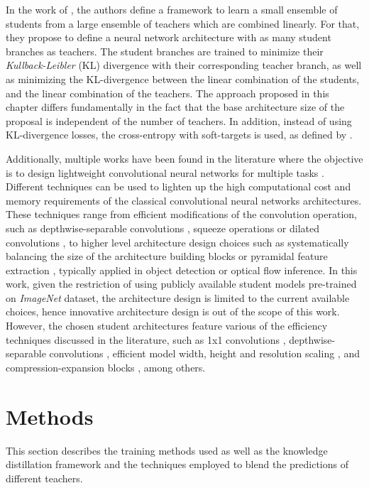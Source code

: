  In the work of \autocite{asif2019}, the authors define a framework to learn a small ensemble of students from a large ensemble of teachers which are combined linearly. For that, they propose to define a neural network architecture with as many student branches as teachers. The student branches are trained to minimize their \textit{Kullback-Leibler} (KL) divergence with their corresponding teacher branch, as well as minimizing the KL-divergence between the linear combination of the students, and the linear combination of the teachers. The approach proposed in this chapter differs fundamentally in the fact that the base architecture size of the proposal is independent of the number of teachers. In addition, instead of using KL-divergence losses, the cross-entropy with soft-targets is used, as defined by \autocite{hinton2015}.

 Additionally, multiple works have been found in the literature where the objective is to design lightweight convolutional neural networks for multiple tasks \autocite{zhou2020, jeon2021, hui2018}. Different techniques can be used to lighten up the high computational cost and memory requirements of the classical convolutional neural networks architectures. These techniques range from efficient modifications of the convolution operation, such as depthwise-separable convolutions \autocite{chollet2017}, squeeze operations \autocite{qiang2021} or dilated convolutions \autocite{Yu2016}, to higher level architecture design choices such as systematically balancing the size of the architecture building blocks \autocite{tan2019} or pyramidal feature extraction \autocite{Lin2017}, typically applied in object detection or optical flow inference. In this work, given the restriction of using publicly available student models pre-trained on \textit{ImageNet} dataset, the architecture design is limited to the current available choices, hence innovative architecture design is out of the scope of this work. However, the chosen student architectures feature various of the efficiency techniques discussed in the literature, such as 1x1 convolutions \autocite{szegedy2017}, depthwise-separable convolutions \autocite{chollet2017}, efficient model width, height and resolution scaling \autocite{tan2019}, and compression-expansion blocks \autocite{howard2017, sandler2018}, among others.
 
 \section{Methods} \label{sec:distillation_methods}
This section describes the training methods used as well as the knowledge distillation framework and the techniques employed to blend the predictions of different teachers.

